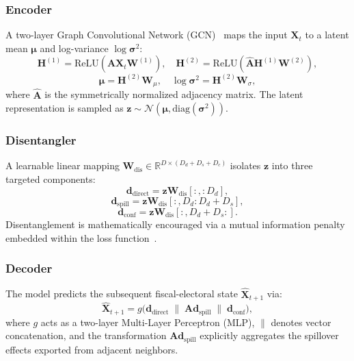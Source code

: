 \documentclass[conference]{IEEEtran}
\begin{document}
\subsubsection{Encoder}
A two-layer Graph Convolutional Network (GCN)~\cite{kipf2017semi} maps the input $\mathbf{X}_t$ to a latent mean $\boldsymbol{\mu}$ and log-variance $\log\boldsymbol{\sigma}^2$:
\[
\mathbf{H}^{(1)} = \mathrm{ReLU}(\hat{\mathbf{A}}\mathbf{X}_t\mathbf{W}^{(1)}),\quad
\mathbf{H}^{(2)} = \mathrm{ReLU}(\hat{\mathbf{A}}\mathbf{H}^{(1)}\mathbf{W}^{(2)}),
\]
\[
\boldsymbol{\mu} = \mathbf{H}^{(2)}\mathbf{W}_\mu,\quad
\log\boldsymbol{\sigma}^2 = \mathbf{H}^{(2)}\mathbf{W}_\sigma,
\]
where $\hat{\mathbf{A}}$ is the symmetrically normalized adjacency matrix. The latent representation is sampled as $\mathbf{z} \sim \mathcal{N}(\boldsymbol{\mu}, \mathrm{diag}(\boldsymbol{\sigma}^2))$.

\subsubsection{Disentangler}
A learnable linear mapping $\mathbf{W}_{\text{dis}} \in \mathbb{R}^{D \times (D_d+D_s+D_c)}$ isolates $\mathbf{z}$ into three targeted components:
\[
\mathbf{d}_{\text{direct}} = \mathbf{z}\mathbf{W}_{\text{dis}}[:,:D_d],
\]
\[
\mathbf{d}_{\text{spill}} = \mathbf{z}\mathbf{W}_{\text{dis}}[:,D_d:D_d+D_s],
\]
\[
\mathbf{d}_{\text{conf}} = \mathbf{z}\mathbf{W}_{\text{dis}}[:,D_d+D_s:].
\]
Disentanglement is mathematically encouraged via a mutual information penalty embedded within the loss function~\cite{kim2018disentangling, chen2018isolating}.

\subsubsection{Decoder}
The model predicts the subsequent fiscal-electoral state $\hat{\mathbf{X}}_{t+1}$ via:
\[
\hat{\mathbf{X}}_{t+1} = g\big( \mathbf{d}_{\text{direct}} \;\|\; \mathbf{A}\mathbf{d}_{\text{spill}} \;\|\; \mathbf{d}_{\text{conf}} \big),
\]
where $g$ acts as a two-layer Multi-Layer Perceptron (MLP), $\|$ denotes vector concatenation, and the transformation $\mathbf{A}\mathbf{d}_{\text{spill}}$ explicitly aggregates the spillover effects exported from adjacent neighbors.
\end{document}

